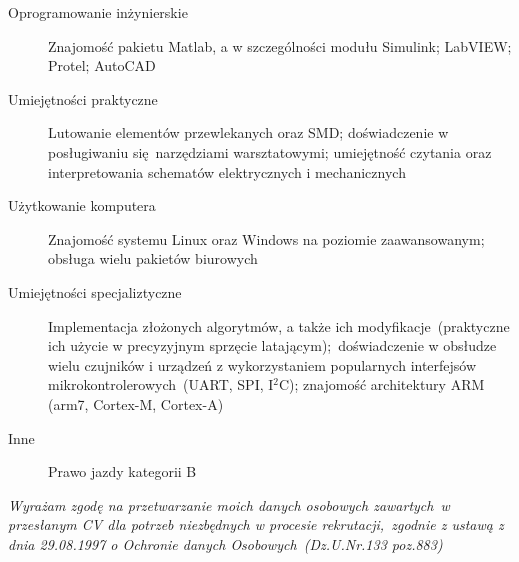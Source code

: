 \documentclass[]{friggeri-cv}
\begin{document}
\begin{description}
  \item [Oprogramowanie inżynierskie] Znajomość pakietu Matlab, a w szczególności modułu Simulink; LabVIEW; Protel; AutoCAD
  \item [Umiejętności praktyczne] Lutowanie elementów przewlekanych oraz SMD; doświadczenie w posługiwaniu się\
    narzędziami warsztatowymi; umiejętność czytania oraz interpretowania schematów elektrycznych i mechanicznych
  \item [Użytkowanie komputera] Znajomość systemu Linux oraz Windows na poziomie zaawansowanym; obsługa wielu pakietów biurowych
  \item [Umiejętności specjaliztyczne] Implementacja złożonych algorytmów, a także ich modyfikacje\
    (praktyczne ich użycie w precyzyjnym sprzęcie latającym);\ 
    doświadczenie w obsłudze wielu czujników i urządzeń z wykorzystaniem popularnych interfejsów mikrokontrolerowych\
    (UART, SPI, {\normalfont I\(^{2}\)C}); znajomość architektury ARM (arm7, Cortex-M, Cortex-A)
  \item [Inne] Prawo jazdy kategorii B
\end{description}
\null
\vfill
\emph{Wyrażam zgodę na przetwarzanie moich danych osobowych zawartych\
 w przesłanym CV dla potrzeb niezbędnych w procesie rekrutacji,\
  zgodnie z ustawą z dnia 29.08.1997 o Ochronie danych Osobowych\
 (Dz.U.Nr.133 poz.883)}
% 
\end{document}
